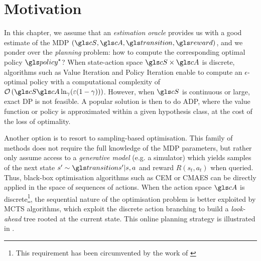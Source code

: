 \section{Motivation}

In this chapter, we assume that an \emph{estimation oracle} provides us with a good estimate of the \gls{MDP} $(\cS, \cA, \Ps, \reward)$, and we ponder over the \emph{planning} problem: how to compute the corresponding optimal policy $\policy^\star$?
When state-action space $\cS\times\cA$ is discrete,  algorithms such as Value Iteration \citep{Bellman1957} and Policy Iteration \citep{Howard1960} enable to compute an $\epsilon$-optimal policy with a computational complexity of $\cO\left(\cS\cA\log_\gamma(\epsilon(1-\gamma))\right)$. However, when $\cS$ is continuous or large, exact \gls{DP} is not feasible. A popular solution is then to do \gls{ADP}, where the value function or policy is approximated within a given hypothesis class, at the cost of the loss of optimality.

Another option is to resort to sampling-based optimisation. This family of methods does not require the full knowledge of the MDP parameters, but rather only assume access to a \emph{generative model} (e.g. a simulator) which yields samples of the next state $s' \sim \Ps{s'|s,a}$ and reward $R(s_t, a_t)$ when queried. Thus, black-box optimisation algorithms such as \gls{CEM} or \gls{CMAES} can be directly applied in the space of sequences of actions. When the action space $\cA$ is discrete\footnote{This requirement has been circumvented by the work of \citet{Coulom2007,Chaslot2008,Wang2009,Busoniu2013,Busoniu2018}}, the sequential nature of the optimisation problem is better exploited by \gls{MCTS} algorithms, which exploit the discrete action branching to build a \emph{look-ahead} tree rooted at the current state. This online planning strategy is illustrated in .

